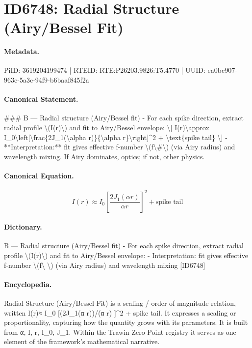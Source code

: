 \section*{ID6748: Radial Structure (Airy/Bessel Fit)}
\paragraph{Metadata.}
PiID: 3619204199474 | RTEID: RTE:P26203.9826:T5.4770 | UUID: ea0bc907-963e-5a3c-94f9-b6baaf845f2a

\paragraph{Canonical Statement.}
\#\#\# B — Radial structure (Airy/Bessel fit) - For each spike direction, extract radial profile \textbackslash{}(I(r)\textbackslash{}) and fit to Airy/Bessel envelope: \textbackslash{}[ I(r)\textbackslash{}approx I\_0\textbackslash{}left[\textbackslash{}frac\{2J\_1(\textbackslash{}alpha r)\}\{\textbackslash{}alpha r\}\textbackslash{}right]\textasciicircum{}2 + \textbackslash{}text\{spike tail\} \textbackslash{}] - **Interpretation:** fit gives effective f-number \textbackslash{}(f\textbackslash{}\#\textbackslash{}) (via Airy radius) and wavelength mixing. If Airy dominates, optics; if not, other physics.

\paragraph{Canonical Equation.}
\[
I(r)\approx I_0\left[\frac{2J_1(\alpha r)}{\alpha r}\right]^2 + \text{spike tail}
\]

\paragraph{Dictionary.}
B — Radial structure (Airy/Bessel fit) - For each spike direction, extract radial profile \textbackslash{}(I(r)\textbackslash{}) and fit to Airy/Bessel envelope: - Interpretation: fit gives effective f-number \textbackslash{}(f\textbackslash{} \textbackslash{}) (via Airy radius) and wavelength mixing [ID6748]

\paragraph{Encyclopedia.}
Radial Structure (Airy/Bessel Fit) is a scaling / order-of-magnitude relation, written I(r)≈ I\_0 [(2J\_1(α r))/(α r) ]\textasciicircum{}2 + spike tail. It expresses a scaling or proportionality, capturing how the quantity grows with its parameters. It is built from α, I, r, I\_0, J\_1. Within the Trawin Zero Point registry it serves as one element of the framework's mathematical narrative.
